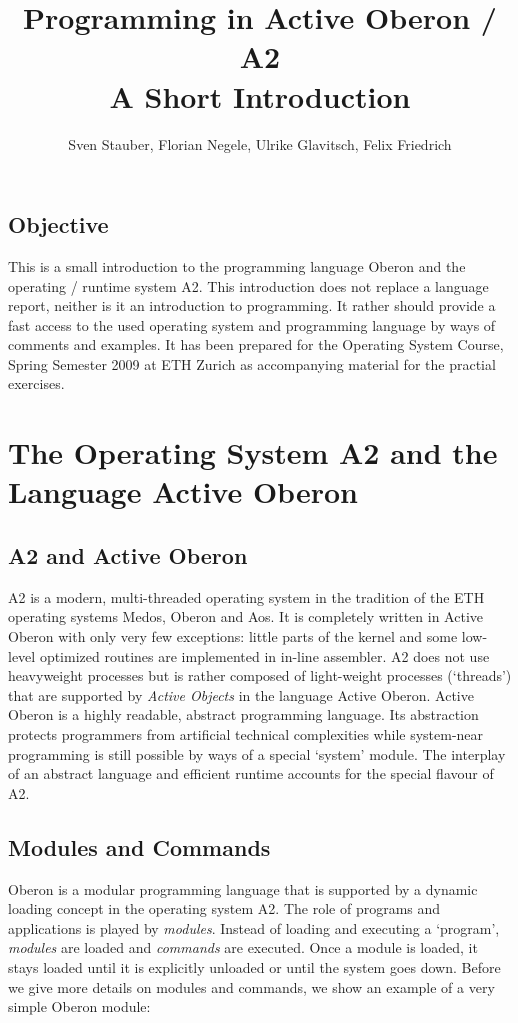 \documentclass[a4paper,11pt]{article}
\begin{document}
\title{Programming in Active Oberon / A2 \\[1em] \normalsize A Short Introduction}
\author{Sven Stauber, Florian Negele, Ulrike Glavitsch, Felix Friedrich}
\maketitle

\tableofcontents
\subsection*{Objective}
This is a small introduction to the programming language Oberon and the operating / runtime system A2. This introduction does not replace a language report, neither is it an introduction to programming. It rather should provide a fast access to the used operating system and programming language by ways of comments and examples. It has been prepared for the Operating System Course, Spring Semester 2009 at ETH Zurich as accompanying material for the practial exercises.

\section{The Operating System A2 and the Language Active Oberon}
\subsection{A2 and Active Oberon}
A2 is a modern, multi-threaded operating system in the tradition of the ETH operating systems Medos, Oberon and Aos. It is completely written in Active Oberon with only very few exceptions: little parts of the kernel and some low-level optimized routines are implemented in in-line assembler. A2 does not use heavyweight processes but is rather composed of light-weight processes (`threads') that are supported by {\em Active Objects} in the language Active Oberon. Active Oberon is a highly readable, abstract programming language. Its abstraction protects programmers from artificial technical complexities while system-near programming is still possible by ways of a special `system' module. The interplay of an abstract language and efficient runtime accounts for the special flavour of A2.

\subsection{Modules and Commands}
Oberon is a modular programming language that is supported by a dynamic loading concept in the operating system A2. The role of programs and applications is played by {\em modules}. Instead of loading and executing a `program', {\em modules} are loaded and {\em commands} are executed. Once a module is loaded, it stays loaded until it is explicitly unloaded or until the system goes down. Before we give more details on modules and commands, we show an example of a very simple Oberon module:
\end{document}
